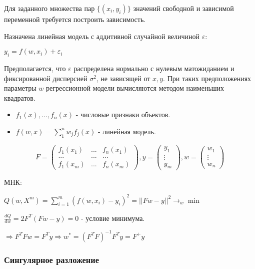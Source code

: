 \documentclass{article}
\begin{document}
Для заданного множества пар $\{(x_i, y_i)\}$ значений свободной и зависимой
переменной требуется построить зависимость.

Назначена линейная модель с аддитивной случайной величиной $\varepsilon$:

$y_i = f(w, x_i) + \varepsilon_i$

Предполагается, что $\varepsilon$ распределена нормально с нулевым матожиданием
и фиксированной дисперсией $\sigma^2$, не зависящей от $x, y$. При таких
предположениях параметры $w$ регрессионной модели вычисляются методом наименьших
квадратов.

\begin{itemize}
	\item $f_1(x), ..., f_n(x)$ - числовые признаки объектов.
	\item $f(w, x) = \sum\limits_1^n w_j f_j(x)$ - линейная модель.
\end{itemize}

\begin{equation}
	F =
	\begin{pmatrix}
		f_1(x_1) & ... & f_n(x_1) \\
		... & ... & ... \\
		f_1(x_m) & ... & f_n(x_m)
	\end{pmatrix},
	y = 
	\begin{pmatrix}
		y_1 \\
		\vdots \\
		y_m
	\end{pmatrix},
	w =
	\begin{pmatrix}
		w_1 \\
		\vdots \\
		w_n
	\end{pmatrix}
\end{equation}

МНК:

$Q(w, X^m) = \sum\limits_{i=1}^m (f(w, x_i) - y_i)^2 = ||F w - y||^2 \to_w \min$

$\frac{d Q}{d w} = 2F^T(F w - y) = 0$ - условие минимума.

$\Rightarrow F^T F w = F^T y \Rightarrow w^* = (F^T F)^{-1}F^T y = F^+ y$

\subsubsection{Сингулярное разложение}

\end{document}
